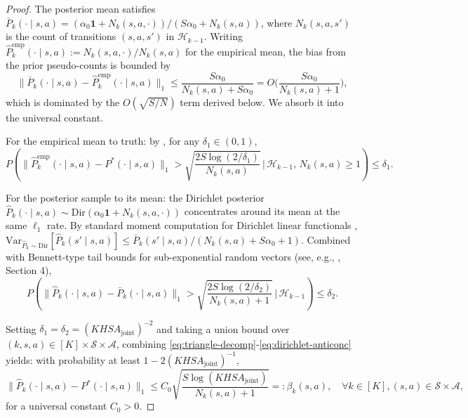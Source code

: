 \begin{proof}
The posterior mean satisfies $\bar{P}_k(\cdot \mid s, a) = (\alpha_0 \mathbf{1} + N_k(s, a, \cdot))/(S\alpha_0 + N_k(s, a))$, where $N_k(s, a, s')$ is the count of transitions $(s, a, s')$ in $\mathcal{H}_{k-1}$. Writing $\hat{P}^{\mathrm{emp}}_k(\cdot \mid s, a) := N_k(s, a, \cdot)/N_k(s, a)$ for the empirical mean, the bias from the prior pseudo-counts is bounded by
\begin{equation}
\label{eq:prior-bias}
\|\bar{P}_k(\cdot \mid s, a) - \hat{P}^{\mathrm{emp}}_k(\cdot \mid s, a)\|_1 \leq \frac{S \alpha_0}{N_k(s, a) + S\alpha_0} = O\Big(\frac{S\alpha_0}{N_k(s, a) + 1}\Big),
\end{equation}
which is dominated by the $O(\sqrt{S/N})$ term derived below. We absorb it into the universal constant.

For the empirical mean to truth: by \citet{weissman2003inequalities}, for any $\delta_1 \in (0, 1)$,
\begin{equation}
\label{eq:weissman}
P\left(\|\hat{P}^{\mathrm{emp}}_k(\cdot \mid s, a) - P^*(\cdot \mid s, a)\|_1 > \sqrt{\frac{2 S \log(2/\delta_1)}{N_k(s, a)}}\,\Big|\,\mathcal{H}_{k-1},\, N_k(s, a) \geq 1\right) \leq \delta_1.
\end{equation}

For the posterior sample to its mean: the Dirichlet posterior $\hat{P}_k(\cdot \mid s, a) \sim \mathrm{Dir}(\alpha_0 \mathbf{1} + N_k(s, a, \cdot))$ concentrates around its mean at the same $\ell_1$ rate. By standard moment computation for Dirichlet linear functionals \citep[Section 36.2]{lattimore2020bandit}, $\mathrm{Var}_{\hat{P}_k \sim \mathrm{Dir}}[\hat{P}_k(s' \mid s, a)] \leq \bar{P}_k(s' \mid s, a)/(N_k(s, a) + S\alpha_0 + 1)$. Combined with Bennett-type tail bounds for sub-exponential random vectors (see, e.g., \citealp{russo2014learning}, Section 4),
\begin{equation}
\label{eq:dirichlet-anticonc}
P\left(\|\hat{P}_k(\cdot \mid s, a) - \bar{P}_k(\cdot \mid s, a)\|_1 > \sqrt{\frac{2 S \log(2/\delta_2)}{N_k(s, a) + 1}}\,\Big|\,\mathcal{H}_{k-1}\right) \leq \delta_2.
\end{equation}

Setting $\delta_1 = \delta_2 = (KH SA_{\mathrm{joint}})^{-2}$ and taking a union bound over $(k, s, a) \in [K] \times \mathcal{S} \times \mathcal{A}$, combining \eqref{eq:triangle-decomp}-\eqref{eq:dirichlet-anticonc} yields: with probability at least $1 - 2 (KH SA_{\mathrm{joint}})^{-1}$,
\begin{equation}
\label{eq:trans-concentration-uniform}
\|\hat{P}_k(\cdot \mid s, a) - P^*(\cdot \mid s, a)\|_1 \leq C_0 \sqrt{\frac{S \log(KH SA_{\mathrm{joint}})}{N_k(s, a) + 1}} =: \beta_k(s, a), \quad \forall k \in [K], (s, a) \in \mathcal{S} \times \mathcal{A},
\end{equation}
for a universal constant $C_0 > 0$.


\end{proof}
